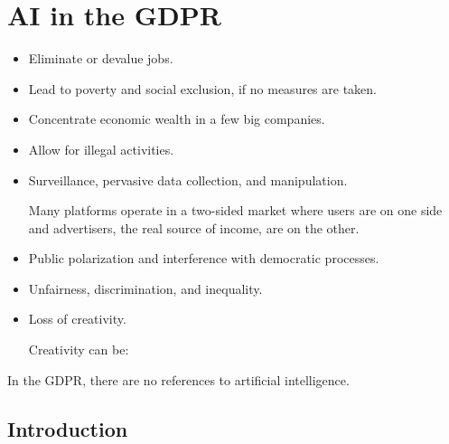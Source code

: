 \chapter{AI in the GDPR}

\begin{remark}[AI risks] \phantom{}
    \begin{itemize}
        \item Eliminate or devalue jobs.
        \item Lead to poverty and social exclusion, if no measures are taken.
        \item Concentrate economic wealth in a few big companies.
        \item Allow for illegal activities.
        \item Surveillance, pervasive data collection, and manipulation.
            \begin{example}
                Many platforms operate in a two-sided market where users are on one side and advertisers, the real source of income, are on the other.
            \end{example}
        \item Public polarization and interference with democratic processes.
        \item Unfairness, discrimination, and inequality.
        \item Loss of creativity.
            \begin{remark}
                Creativity can be:
            \end{remark}
    \end{itemize}
\end{remark}

\begin{remark}
    In the GDPR, there are no references to artificial intelligence.
\end{remark}



\section{Introduction}


